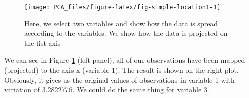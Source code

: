 \documentclass[
]{book}
\theoremstyle{definition}
\theoremstyle{definition}
\theoremstyle{definition}
\theoremstyle{remark}
\begin{document}
\begin{figure}

{\centering \texttt{[image: PCA\_files/figure-latex/fig-simple-location1-1]} 

}

\caption{Here, we select two variables and show how the data is spread according to the variables. We show how the data is projected on the fist axis}\label{fig:fig-simple-location1}
\end{figure}

We can see in Figure \ref{fig:fig-simple-location1} (left panel), all of our observations have been mapped (projected) to the axis x (variable 1). The result is shown on the right plot. Obviously, it gives us the original values of observations in variable 1 with variation of 3.2822776. We could do the same thing for variable 3.
\end{document}
